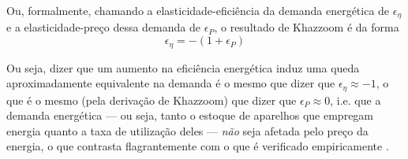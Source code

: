 Ou, formalmente, chamando a elasticidade-eficiência da demanda energética de $\epsilon_{\eta}$ e a elasticidade-preço dessa demanda de $\epsilon_P$, o resultado de Khazzoom é da forma
$$
\epsilon_{\eta} = -(1+\epsilon_P)
$$



Ou seja, dizer que um aumento na eficiência energética induz uma queda aproximadamente equivalente na demanda é o mesmo que dizer que $\epsilon_{\eta} \approx -1$, o que é o mesmo (pela derivação de Khazzoom) que dizer que $\epsilon_P \approx 0$, i.e. que a demanda energética --- ou seja, tanto o estoque de aparelhos que empregam energia quanto a taxa de utilização deles --- \textit{não} seja afetada pelo preço da energia, o que contrasta flagrantemente com o que é verificado empiricamente \parencite[p. 39]{Khazzoom1980}.

